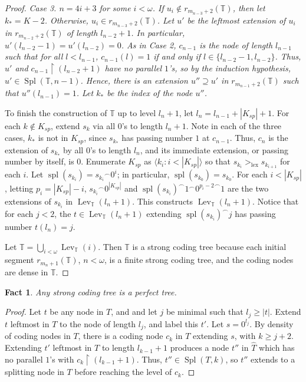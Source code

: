 \documentclass{amsart}
\newtheorem{fact}[thm]{Fact}
\theoremstyle{remark}
\theoremstyle{definition}
\theoremstyle{remark}
\newcommand{\om}{\omega}
\newcommand{\contains}{\supseteq}
\DeclareMathOperator{\Spl}{Spl}
\DeclareMathOperator{\spl}{spl}
\DeclareMathOperator{\Lev}{Lev}
\newcommand{\re}{\restriction}
\newcommand{\bT}{\mathbb{T}}
\newcommand{\lgl}{\langle}
\newcommand{\rgl}{\rangle}
\begin{document}
\begin{proof}
\it Case 3. \rm $n=4i+3$ for some $i<\om$.
If $u_i\not\in   r_{m_{n-3}+2}(\bT)$,
then let $k_*=K-2$.
Otherwise, $u_i\in   r_{m_{n-3}+2}(\bT)$.
Let $u'$ be the leftmost extension of
 $u_i$  in $r_{m_{n-2}+2}(\bT)$
of  length $l_{n-2}+1$.
In particular, $u'(l_{n-2}-1)=u'(l_{n-2})=0$.
As in Case 2,
$c_{n-1}$ is the node of length $l_{n-1}$
such that for all $l<l_{n-1}$,
$c_{n-1}(l)=1$ if and only if $l\in\{l_{n-2}-1,l_{n-2}\}$.
Thus, $u'$ and $c_{n-1}\re (l_{n-2}+1)$ have no parallel $1$'s,
so by the induction hypothesis,
$u'\in \Spl(\bT, n-1)$.
Hence, there is an extension $u''\contains u'$ in $r_{m_{n-1}+2}(\bT)$ such that
$u''(l_{n-1})=1$.
Let $k_*$ be the index of the  node $u''$.



To finish the construction of $\bT$ up to level $l_n+1$,
let   $l_n=l_{n-1}+|K_{sp}|+1$.
For each $k\not\in K_{sp}$,
extend $s_k$ via all $0$'s to length $l_n+1$.
Note in each of the three cases, $k_*$ is not in $ K_{sp}$,
since $s_{k_*}$ has passing number $1$ at $c_{n-1}$.
Thus, $c_n$ is  the extension of $s_{k_*}$ by all $0$'s to length $l_n$, and its immediate extension, or passing number by itself, is $0$.
Enumerate $K_{sp}$  as $\lgl k_i:i<|K_{sp}|\rgl$   so that
$s_{k_i}>_{\mathrm{lex}}s_{k_{i+1}}$ for each $i$.
Let $\spl(s_{k_i})={s_{k_i}}^{\frown}0^{i}$;  in particular,
$\spl(s_{k_0})=s_{k_0}$.
For each $i<|K_{sp}|$,
 letting $p_i=|K_{sp}|-i$,
 ${s_{k_i}}^{\frown}0^{|K_{sp}|}$  and
${\spl(s_{k_i})}^{\frown}1^{\frown} {0^{p_i-2}}^{\frown}1$
are the two extensions of $s_{k_i}$ in
$\Lev_{\bT}(l_n+1)$.
This constructs $\Lev_{\bT}(l_n+1)$.
Notice that for each $j<2$, the $t\in \Lev_{\bT}(l_n+1)$ extending $\spl(s_{k_i})^{\frown}j$ has passing number $t(l_n)=j$.


Let  $\bT=\bigcup_{i<\om}\Lev_{\bT}(i)$.
Then $\bT$ is a strong coding tree because each initial segment  $r_{m_n+1}(\bT)$, $n<\om$,  is a  finite strong coding tree,
and the coding nodes are dense in $\bT$.
\end{proof}






\begin{fact}\label{fact.perfect}
Any   strong coding tree
is a perfect tree.
\end{fact}



\begin{proof}
Let  $t$ be   any node in $T$, and
and let $j$ be minimal such that $l_j\ge |t|$.
Extend $t$ leftmost in $T$ to the node of length $l_j$, and label this $t'$.
Let $s=0^{l_j}$.
By density of coding nodes in $T$, there is a coding node  $c_k$ in  $T$ extending $s$, with $k\ge j+2$.
Extending $t'$ leftmost in $T$ to length $l_{k-1}+1$ produces a node $t''$ in $\widehat{T}$ which has no parallel $1$'s with $c_k\re (l_{k-1}+1)$.
Thus, $t''\in\Spl(T,k)$, so $t''$ extends to a splitting node in $T$ before reaching the level of $c_k$.
\end{proof}
\end{document}
